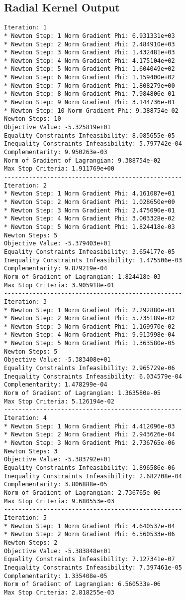 \documentclass{article}
\begin{document}
\subsection{Radial Kernel Output}\label{radial36}

\scriptsize
\begin{minipage}[t]{0.45\textwidth}
\begin{verbatim}
Iteration: 1
* Newton Step: 1 Norm Gradient Phi: 6.931331e+03
* Newton Step: 2 Norm Gradient Phi: 2.484910e+03
* Newton Step: 3 Norm Gradient Phi: 1.432481e+03
* Newton Step: 4 Norm Gradient Phi: 4.175104e+02
* Newton Step: 5 Norm Gradient Phi: 1.604049e+02
* Newton Step: 6 Norm Gradient Phi: 1.159400e+02
* Newton Step: 7 Norm Gradient Phi: 1.808279e+00
* Newton Step: 8 Norm Gradient Phi: 7.984806e-01
* Newton Step: 9 Norm Gradient Phi: 3.144736e-01
* Newton Step: 10 Norm Gradient Phi: 9.388754e-02
Newton Steps: 10
Objective Value: -5.325819e+01
Equality Constraints Infeasibility: 8.085655e-05
Inequality Constraints Infeasibility: 5.797742e-04
Complementarity: 9.950263e-03
Norm of Gradient of Lagrangian: 9.388754e-02
Max Stop Criteria: 1.911769e+00
--------------------------------------------------
Iteration: 2
* Newton Step: 1 Norm Gradient Phi: 4.161087e+01
* Newton Step: 2 Norm Gradient Phi: 1.028650e+00
* Newton Step: 3 Norm Gradient Phi: 2.475090e-01
* Newton Step: 4 Norm Gradient Phi: 3.003328e-02
* Newton Step: 5 Norm Gradient Phi: 1.824418e-03
Newton Steps: 5
Objective Value: -5.379403e+01
Equality Constraints Infeasibility: 3.654177e-05
Inequality Constraints Infeasibility: 1.475506e-03
Complementarity: 9.879219e-04
Norm of Gradient of Lagrangian: 1.824418e-03
Max Stop Criteria: 3.905918e-01
--------------------------------------------------
Iteration: 3
* Newton Step: 1 Norm Gradient Phi: 2.292880e-01
* Newton Step: 2 Norm Gradient Phi: 5.735189e-02
* Newton Step: 3 Norm Gradient Phi: 1.169970e-02
* Newton Step: 4 Norm Gradient Phi: 9.913998e-04
* Newton Step: 5 Norm Gradient Phi: 1.363580e-05
Newton Steps: 5
Objective Value: -5.383408e+01
Equality Constraints Infeasibility: 2.965729e-06
Inequality Constraints Infeasibility: 6.034579e-04
Complementarity: 1.478299e-04
Norm of Gradient of Lagrangian: 1.363580e-05
Max Stop Criteria: 5.126194e-02
--------------------------------------------------
Iteration: 4
* Newton Step: 1 Norm Gradient Phi: 4.412096e-03
* Newton Step: 2 Norm Gradient Phi: 2.943626e-04
* Newton Step: 3 Norm Gradient Phi: 2.736765e-06
Newton Steps: 3
Objective Value: -5.383792e+01
Equality Constraints Infeasibility: 1.896586e-06
Inequality Constraints Infeasibility: 2.682708e-04
Complementarity: 3.806888e-05
Norm of Gradient of Lagrangian: 2.736765e-06
Max Stop Criteria: 9.680553e-03
--------------------------------------------------
Iteration: 5
* Newton Step: 1 Norm Gradient Phi: 4.640537e-04
* Newton Step: 2 Norm Gradient Phi: 6.560533e-06
Newton Steps: 2
Objective Value: -5.383848e+01
Equality Constraints Infeasibility: 7.127341e-07
Inequality Constraints Infeasibility: 7.397461e-05
Complementarity: 1.335408e-05
Norm of Gradient of Lagrangian: 6.560533e-06
Max Stop Criteria: 2.818255e-03
\end{verbatim}
\end{minipage}
\end{document}
